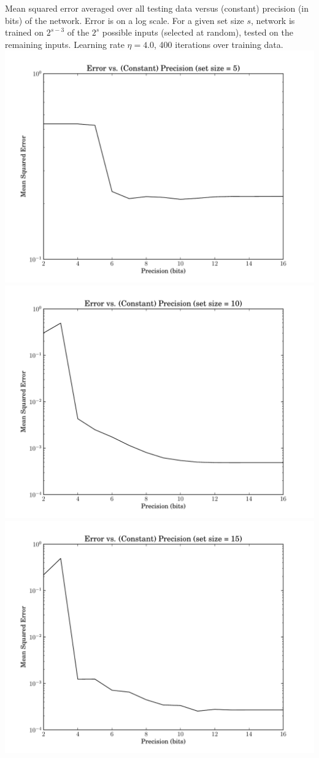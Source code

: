 \documentclass[12pt]{article}
\begin{document}
\begin{center}
Mean squared error averaged over all testing data versus (constant) precision (in bits) of the network. Error is on a log scale. For a given set size $s$, network is trained on $2^{s-3}$ of the $2^s$ possible inputs (selected at random), tested on the remaining inputs. Learning rate $\eta=4.0$, 400 iterations over training data.
\includegraphics[scale=0.7]{error-vs-prec-ss5}
\includegraphics[scale=0.7]{error-vs-prec-ss10}
\includegraphics[scale=0.7]{error-vs-prec-ss15}
\end{center}
\end{document}
